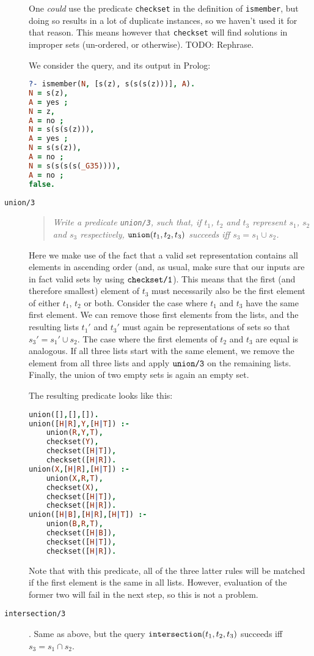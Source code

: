 \documentclass[a4paper]{article}
\newcommand{\pfunc}[1]{\textnormal{\texttt{#1}}\xspace}
\newcommand{\pfuncn}[2]{\textnormal{\texttt{#1/#2}}\xspace}
\begin{document}
\begin{description}
  One \emph{could} use the predicate \pfunc{checkset} in the definition of \pfunc{ismember}, but doing so results in a lot of duplicate instances, so we haven't used it for that reason. This means however that \pfunc{checkset} will find solutions in improper sets (un-ordered, or otherwise). TODO: Rephrase.

  We consider the query, and its output in Prolog:
\begin{lstlisting}[language=prolog]
?- ismember(N, [s(z), s(s(s(z)))], A).
N = s(z),
A = yes ;
N = z,
A = no ;
N = s(s(s(z))),
A = yes ;
N = s(s(z)),
A = no ;
N = s(s(s(s(_G35)))),
A = no ;
false.
\end{lstlisting}
\item[\pfuncn{union}{3}]\hfill
  \begin{quotation}\itshape
    Write a predicate \pfuncn{union}{3}, such that, if $t_1$, $t_2$ and $t_3$ represent $s_1$, $s_2$ and $s_3$ respectively, $\pfunc{union}(t_1, t_2, t_3)$ succeeds iff $s_3 = s_1 \cup s_2$.
  \end{quotation}
  Here we make use of the fact that a valid set representation contains all elements in ascending order (and, as usual, make sure that our inputs are in fact valid sets by using $\pfuncn{checkset}{1}$). This means that the first (and therefore smallest) element of $t_3$ must necessarily also be the first element of either $t_1$, $t_2$ or both. Consider the case where $t_1$ and $t_3$ have the same first element. We can remove those first elements from the lists, and the resulting lists $t_1'$ and $t_3'$ must again be representations of sets so that $s_3' = s_1' \cup s_2$. The case where the first elements of $t_2$ and $t_3$ are equal is analogous. If all three lists start with the same element, we remove the element from all three lists and apply $\pfuncn{union}{3}$ on the remaining lists. Finally, the union of two empty sets is again an empty set. 
  
  The resulting predicate looks like this:
  \begin{lstlisting}[language=prolog]
union([],[],[]).
union([H|R],Y,[H|T]) :- 
	union(R,Y,T),
	checkset(Y), 
	checkset([H|T]),
	checkset([H|R]).
union(X,[H|R],[H|T]) :- 
	union(X,R,T),
	checkset(X), 
	checkset([H|T]),
	checkset([H|R]).
union([H|B],[H|R],[H|T]) :- 
	union(B,R,T),
	checkset([H|B]), 
	checkset([H|T]),
	checkset([H|R]).
\end{lstlisting}

Note that with this predicate, all of the three latter rules will be matched if the first element is the same in all lists. However, evaluation of the former two will fail in the next step, so this is not a problem.
\item[\pfuncn{intersection}{3}]. Same as above, but the query $\pfunc{intersection}(t_1,t_2,t_3)$ succeeds iff $s_3 = s_1 \cap s_2$.


\end{description}
\end{document}
